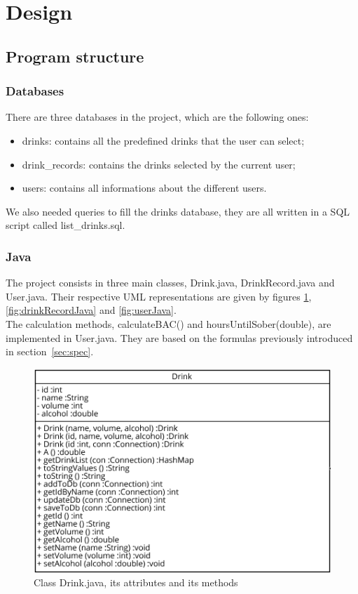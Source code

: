\section{Design}
\label{sec:design}

\subsection{Program structure}
\label{ssec:struct}

\subsubsection{Databases}
\label{sssec:db}

There are three databases in the project, which are the following ones:

\begin{itemize}[noitemsep]
\item drinks: contains all the predefined drinks that the user can select;
\item drink\_records: contains the drinks selected by the current user;
\item users: contains all informations about the different users.
\end{itemize}

We also needed queries to fill the \guillemotleft{} drinks \guillemotright{} database, they are all written in a SQL script called list\_drinks.sql.

\subsubsection{Java}
\label{sssec:java}

The project consists in three main classes, Drink.java, DrinkRecord.java and User.java. Their respective UML representations are given by {\sc figures} \ref{fig:drinkJava}, \ref{fig:drinkRecordJava} and \ref{fig:userJava}.\\

The calculation methods, calculateBAC() and hoursUntilSober(double), are implemented in User.java. They are based on the formulas previously introduced in {\sc section}~\ref{sec:spec}. 

\begin{figure}[H]
\centering
   \includegraphics{./figures/drink.png}
   \caption{Class Drink.java, its attributes and its methods}
   \label{fig:drinkJava}
\end{figure}

